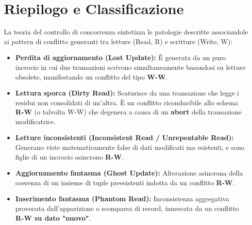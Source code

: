 \section{Riepilogo e Classificazione}

La teoria del controllo di concorrenza sintetizza le patologie descritte associandole ai pattern di conflitto generanti tra letture (Read, R) e scritture (Write, W):

\begin{itemize}
    \item \textbf{Perdita di aggiornamento (Lost Update):} È generata da un puro incrocio in cui due transazioni scrivono simultaneamente basandosi su letture obsolete, manifestando un conflitto del tipo \textbf{W-W}.
    \item \textbf{Lettura sporca (Dirty Read):} Scaturisce da una transazione che legge i residui non consolidati di un'altra. È un conflitto riconducibile allo schema \textbf{R-W} (o talvolta W-W) che degenera a causa di un \textbf{abort} della transazione modificatrice.
    \item \textbf{Letture inconsistenti (Inconsistent Read / Unrepeatable Read):} Generano viste matematicamente false di dati modificati ma esistenti, e sono figlie di un incrocio asincrono \textbf{R-W}.
    \item \textbf{Aggiornamento fantasma (Ghost Update):} Alterazione asincrona della coerenza di un insieme di tuple preesistenti indotta da un conflitto \textbf{R-W}.
    \item \textbf{Inserimento fantasma (Phantom Read):} Inconsistenza aggregativa provocata dall'apparizione o scomparsa di record, innescata da un conflitto \textbf{R-W su dato "nuovo"}.
\end{itemize}
